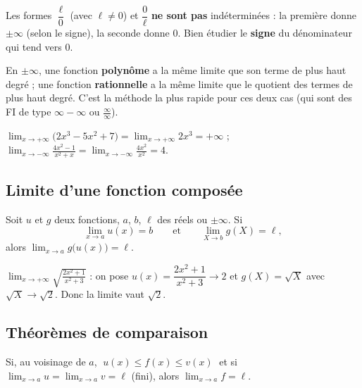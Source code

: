 \begin{aretenir}
Les formes $\dfrac{\ell}{0}$ (avec $\ell\neq0$) et $\dfrac{0}{\ell}$ \textbf{ne sont pas} indéterminées : la première donne $\pm\infty$ (selon le signe), la seconde donne $0$. Bien étudier le \textbf{signe} du dénominateur qui tend vers $0$.
\end{aretenir}

\begin{remarque}
En $\pm\infty$, une fonction \textbf{polynôme} a la même limite que son terme de plus haut degré ; une fonction \textbf{rationnelle} a la même limite que le quotient des termes de plus haut degré. C'est la méthode la plus rapide pour ces deux cas (qui sont des FI de type $\infty-\infty$ ou $\tfrac{\infty}{\infty}$).
\end{remarque}

\begin{exemple}
$\displaystyle\lim_{x\to+\infty}\big(2x^{3}-5x^{2}+7\big)=\lim_{x\to+\infty}2x^{3}=+\infty$ ; \quad
$\displaystyle\lim_{x\to-\infty}\frac{4x^{2}-1}{x^{2}+x}=\lim_{x\to-\infty}\frac{4x^{2}}{x^{2}}=4$.
\end{exemple}

\subsection{Limite d'une fonction composée}

\begin{theoreme}
Soit $u$ et $g$ deux fonctions, $a$, $b$, $\ell$ des réels ou $\pm\infty$. Si
\[
\lim_{x\to a}u(x)=b \qquad\text{et}\qquad \lim_{X\to b}g(X)=\ell,
\]
alors $\displaystyle\lim_{x\to a}g\big(u(x)\big)=\ell$.
\end{theoreme}

\begin{exemple}
$\displaystyle\lim_{x\to+\infty}\sqrt{\frac{2x^{2}+1}{x^{2}+3}}$ : on pose $u(x)=\dfrac{2x^{2}+1}{x^{2}+3}\to2$ et $g(X)=\sqrt X$ avec $\sqrt X\to\sqrt2$. Donc la limite vaut $\sqrt2$.
\end{exemple}

\subsection{Théorèmes de comparaison}

\begin{theoreme}
Si, au voisinage de $a$, $\;u(x)\le f(x)\le v(x)\;$ et si $\displaystyle\lim_{x\to a}u=\lim_{x\to a}v=\ell$ (fini), alors $\displaystyle\lim_{x\to a}f=\ell$.
\end{theoreme}

